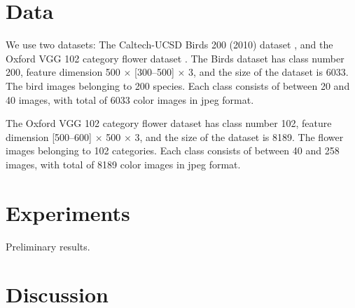 \documentclass{article}
\newcommand{\bb}[1]{\boldsymbol{#1}}
\begin{document}






\section{Data}

	We use two datasets: The Caltech-UCSD Birds 200 (2010) dataset \cite{Welinder2010}, and the Oxford VGG 102 category flower dataset \cite{Nilsback2008}. The Birds dataset has class number 200, feature dimension 500 $\times$ [300--500] $\times$ 3, and the size of the dataset is 6033. The bird images belonging to 200 species. Each class consists of between 20 and 40 images, with total of 6033 color images in jpeg format.
	
	The Oxford VGG 102 category flower dataset has class number 102, feature dimension [500--600] $\times$ 500 $\times$ 3, and the size of the dataset is 8189. The flower images belonging to 102 categories. Each class consists of between 40 and 258 images, with total of 8189 color images in jpeg format.




\section{Experiments}

	Preliminary results.





\section{Discussion}

\end{document}
